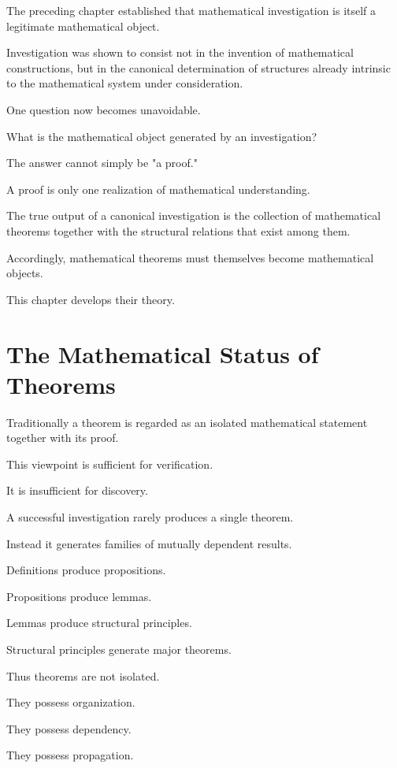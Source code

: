\documentclass[13pt,openany]{book}
\theoremstyle{plain}
\theoremstyle{definition}
\begin{document}
The preceding chapter established that mathematical investigation is itself a
legitimate mathematical object.

Investigation was shown to consist not in the invention of mathematical
constructions, but in the canonical determination of structures already
intrinsic to the mathematical system under consideration.

One question now becomes unavoidable.

What is the mathematical object generated by an investigation?

The answer cannot simply be "a proof."

A proof is only one realization of mathematical understanding.

The true output of a canonical investigation is the collection of mathematical
theorems together with the structural relations that exist among them.

Accordingly, mathematical theorems must themselves become mathematical
objects.

This chapter develops their theory.

\section{The Mathematical Status of Theorems}

Traditionally a theorem is regarded as an isolated mathematical statement
together with its proof.

This viewpoint is sufficient for verification.

It is insufficient for discovery.

A successful investigation rarely produces a single theorem.

Instead it generates families of mutually dependent results.

Definitions produce propositions.

Propositions produce lemmas.

Lemmas produce structural principles.

Structural principles generate major theorems.

Thus theorems are not isolated.

They possess organization.

They possess dependency.

They possess propagation.
\end{document}
